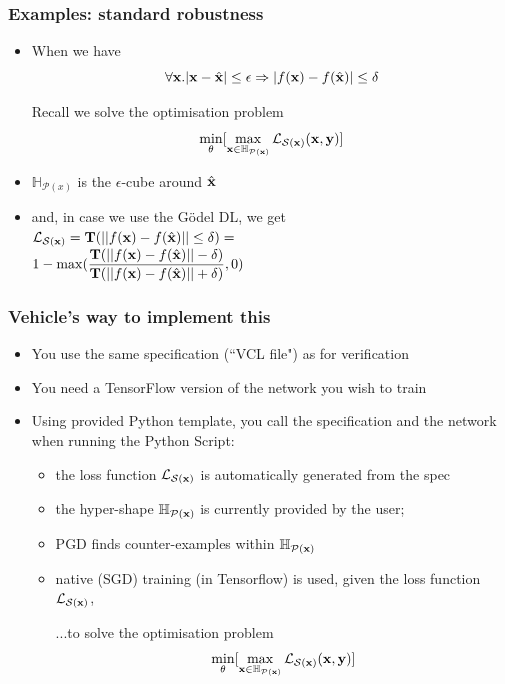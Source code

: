 \documentclass[aspectratio=169]{beamer}
\newcommand{\xs}{\x} 			%
\begin{document}
\begin{frame}[fragile]
\frametitle{Examples: standard robustness}

\begin{itemize}
\item When we have $$\forall \xs. |\xs - \xt| \leq \epsilon \Rightarrow |f(\x) - f(\hat{\x})| \leq \delta$$

\begin{block}{Recall we solve the optimisation problem}
$$\min_{\theta} [ \max_{\xs \in \mathbb{H}_{\mathcal{P}(\xs)}} \lossfn_{\mathcal{S}(\xs)}(\xs, \y)]$$
\end{block}

\item $\mathbb{H}_{\mathcal{P}(x)}$ is the $\epsilon$-cube around $\hat{\mathbf{x}}$

\item and, in case we use the G\"{o}del DL, we get \\
 $\lossfn_{\mathcal{S}(\xs)} = \large{\translation ( || f(\x) - f(\hat{\x})|| \leq \delta) }= $\\ $1 - \max(\dfrac{\mathbf{T}(|| f(\mathbf{x}) - f(\hat{\mathbf{x}})|| - \delta)}{\mathbf{T} (|| f(\mathbf{x}) - f(\hat{\mathbf{x}})|| + \delta)},0) $

\end{itemize}

\end{frame}

\begin{frame}[fragile]
\frametitle{Vehicle's way to implement this}

\begin{itemize}[<+->]
\item You use the same specification (``VCL file") as for verification
\item You need a TensorFlow version of the network you wish to train
\item Using provided Python template, you call the specification and the network when running the Python Script:

\begin{itemize}[<+->]
\item the loss function $\lossfn_{\mathcal{S}(\xs)}$ is automatically generated from the spec
\item the hyper-shape  $\mathbb{H}_{\mathcal{P}(\xs)} $ is currently provided by the user;
\item PGD finds counter-examples within $\mathbb{H}_{\mathcal{P}(\xs)} $
\item native (SGD) training (in Tensorflow) is used, given the loss function $\lossfn_{\mathcal{S}(\xs)}$,
\begin{block}{...to solve the optimisation problem}
$$\min_{\theta} [ \max_{\xs \in \mathbb{H}_{\mathcal{P}(\xs)}} \lossfn_{\mathcal{S}(\xs)}(\xs, \y)]$$
\end{block}
\end{itemize}

\end{itemize}


\end{frame}
\end{document}
